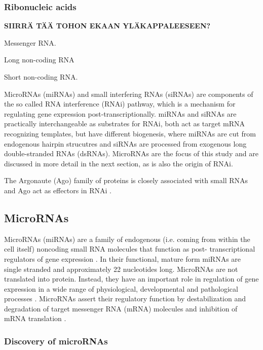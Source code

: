 \subsubsection{Ribonucleic acids}\label{ribonucleic-acids}

\textbf{SIIRRÄ TÄÄ TOHON EKAAN YLÄKAPPALEESEEN?}

Messenger RNA.

Long non-coding RNA

Short non-coding RNA.

MicroRNAs (miRNAs) and small interfering RNAs (siRNAs) are components of the
so called RNA interference (RNAi) pathway, which is a mechanism for regulating
gene expression post-transcriptionally. miRNAs and siRNAs are practically
interchangeable as substrates for RNAi, both act as target mRNA recognizing
templates, but have different biogenesis, where miRNAs are cut from endogenous hairpin
strucutres and siRNAs are processed from exogenous long double-stranded RNAs (dsRNAs).
\cite{Du2005} MicroRNAs are the focus of this study and are discussed in more
detail in the next section, as is also the origin of RNAi.

The Argonaute (Ago) family of proteins is closely associated with small RNAs and
Ago act as effectors in RNAi \cite{Ha2014}.







\subsection{MicroRNAs}\label{micrornas}

MicroRNAs (miRNAs) are a family of endogenous (i.e. coming from within the
cell itself) noncoding small RNA molecules that function as post-
transcriptional regulators of gene expression \citep{Ambros2004}. In their
functional, mature form miRNAs are single stranded and approximately 22
nucleotides long. MicroRNAs are not translated into protein. Instead, they
have an important role in regulation of gene expression in a wide range of
physiological, developmental and pathological processes \citep{Bartel2009}.
MicroRNAs assert their regulatory function by destabilization and degradation
of target messenger RNA (mRNA) molecules and inhibition of mRNA translation
\citep{Fabian2010}.



\subsubsection{Discovery of microRNAs}

